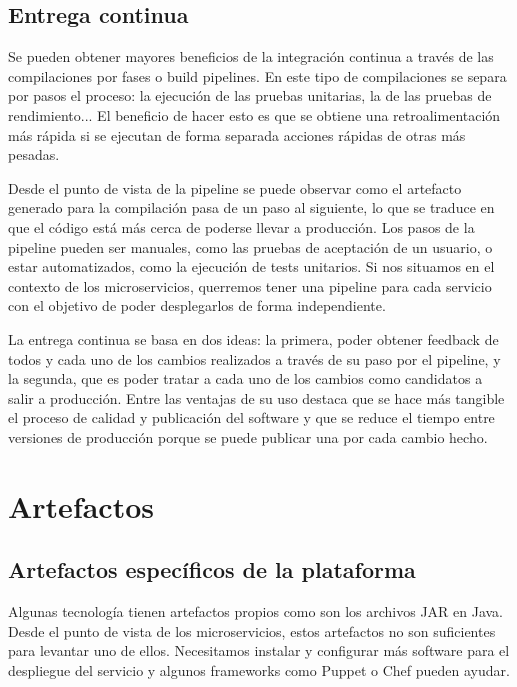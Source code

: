 \documentclass[11pt,a4paper]{article}
\begin{document}
\subsection{Entrega continua}

Se pueden obtener mayores beneficios de la integración continua a través de las compilaciones por fases o build pipelines. En este tipo de compilaciones se separa por pasos el proceso: la ejecución de las pruebas unitarias, la de las pruebas de rendimiento... El beneficio de hacer esto es que se obtiene una retroalimentación más rápida si se ejecutan de forma separada acciones rápidas de otras más pesadas.

Desde el punto de vista de la pipeline se puede observar como el artefacto generado para la compilación pasa de un paso al siguiente, lo que se traduce en que el código está más cerca de poderse llevar a producción. Los pasos de la pipeline pueden ser manuales, como las pruebas de aceptación de un usuario, o estar automatizados, como la ejecución de tests unitarios. Si nos situamos en el contexto de los microservicios, querremos tener una pipeline para cada servicio con el objetivo de poder desplegarlos de forma independiente.

La entrega continua se basa en dos ideas: la primera, poder obtener feedback de todos y cada uno de los cambios realizados a través de su paso por el pipeline, y la segunda, que es poder tratar a cada uno de los cambios como candidatos a salir a producción. Entre las ventajas de su uso destaca que se hace más tangible el proceso de calidad y publicación del software y que se reduce el tiempo entre versiones de producción porque se puede publicar una por cada cambio hecho.

\section{Artefactos}

\subsection{Artefactos específicos de la plataforma}

Algunas tecnología tienen artefactos propios como son los archivos JAR en Java. Desde el punto de vista de los microservicios, estos artefactos no son suficientes para levantar uno de ellos. Necesitamos instalar y configurar más software para el despliegue del servicio y algunos frameworks como Puppet o Chef pueden ayudar.
\end{document}
